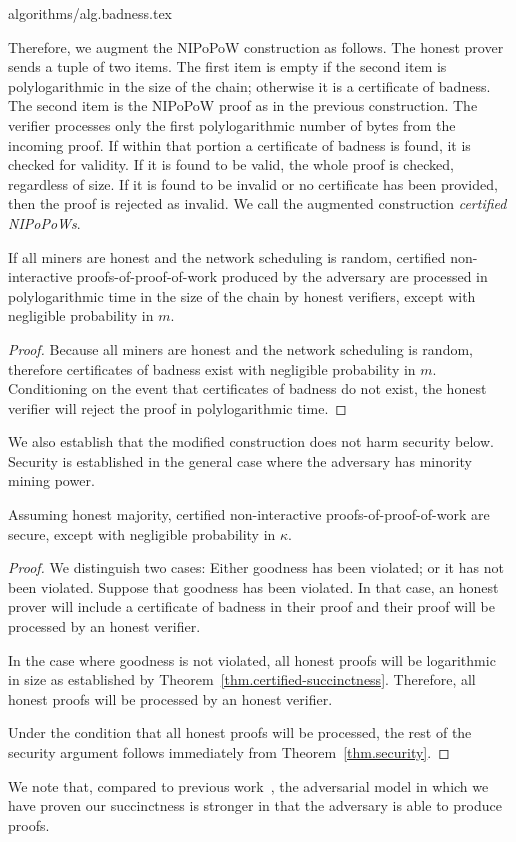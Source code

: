 {algorithms/alg.badness.tex}

Therefore, we augment the NIPoPoW construction as follows. The honest prover
sends a tuple of two items. The first item is empty if the second item is
polylogarithmic in the size of the chain; otherwise it is a certificate of
badness. The second item is the NIPoPoW proof as in the previous construction.
The verifier processes only the first polylogarithmic number of bytes from the
incoming proof. If within that portion a certificate of badness is found, it is
checked for validity. If it is found to be valid, the whole proof is checked,
regardless of size. If it is found to be invalid or no certificate has been
provided, then the proof is rejected as invalid. We call the augmented
construction \textit{certified NIPoPoWs}.

\begin{theorem}
    \label{thm.certified-succinctness}
    If all miners are honest and the network scheduling is random,
    certified non-interactive proofs-of-proof-of-work produced by the adversary
    are processed in polylogarithmic time in the size of the chain by honest
    verifiers, except with negligible probability in $m$.
\end{theorem}
\begin{proof}
    Because all miners are honest and the network scheduling is random,
    therefore certificates of badness exist with negligible probability in $m$.
    Conditioning on the event that certificates of badness do not exist, the
    honest verifier will reject the proof in polylogarithmic time.
    \Qed
\end{proof}

We also establish that the modified construction does not harm security below.
Security is established in the general case where the adversary has minority
mining power.

\begin{theorem}
    Assuming honest majority, certified non-interactive proofs-of-proof-of-work
    are secure, except with negligible probability in $\kappa$.
\end{theorem}
\begin{proof}
    We distinguish two cases: Either goodness has been violated; or it has not
    been violated. Suppose that goodness has been violated. In that case, an
    honest prover will include a certificate of badness in their proof and their
    proof will be processed by an honest verifier.

    In the case where goodness is not violated, all honest proofs will be
    logarithmic in size as established by
    Theorem~\ref{thm.certified-succinctness}. Therefore, all honest proofs will
    be processed by an honest verifier.

    Under the condition that all honest proofs will be processed, the rest of
    the security argument follows immediately from Theorem~\ref{thm.security}.
    \Qed
\end{proof}

We note that, compared to previous work~\cite{KLS}, the adversarial model in
which we have proven our succinctness is stronger in that the adversary is able
to produce proofs.
